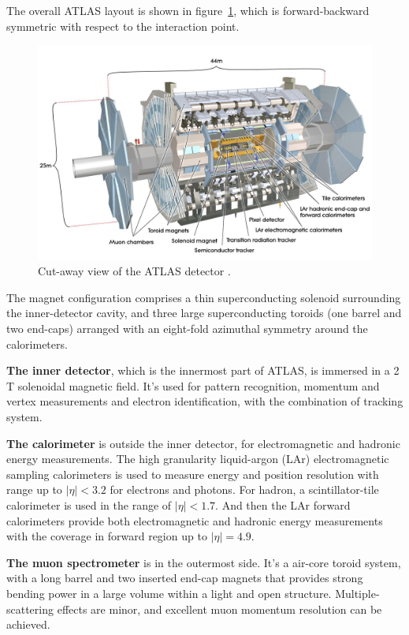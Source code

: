 The overall ATLAS layout is shown in figure~\ref{fig:atlas_layout}, which is forward-backward symmetric with respect to the interaction point.
\begin{figure}[!htb]
  \centering
  \includegraphics[width=1.0\textwidth]{figures/Detector/atlas_layout.jpg}
  \caption{Cut-away view of the ATLAS detector \cite{Pequenao:1095924}.}
  \label{fig:atlas_layout}
\end{figure}
The magnet configuration comprises a thin superconducting solenoid surrounding the inner-detector cavity, 
and three large superconducting toroids (one barrel and two end-caps) arranged with an eight-fold azimuthal symmetry around the calorimeters.

\textbf{The inner detector}, which is the innermost part of ATLAS, is immersed in a 2 T solenoidal magnetic field.
It's used for pattern recognition, momentum and vertex measurements and electron identification, with the combination of tracking system.

\textbf{The calorimeter} is outside the inner detector, for electromagnetic and hadronic energy measurements.
The high granularity liquid-argon (LAr) electromagnetic sampling calorimeters is used to measure energy and position resolution with range up to $|\eta| < 3.2$ for electrons and photons.
For hadron, a scintillator-tile calorimeter is used in the range of $|\eta| < 1.7$.
And then the LAr forward calorimeters provide both electromagnetic and hadronic energy measurements with the coverage in forward region up to $|\eta| = 4.9$.

\textbf{The muon spectrometer} is in the outermost side.
It's a air-core toroid system, with a long barrel and two inserted end-cap magnets that provides strong bending power in a large volume within a light and open structure.
Multiple-scattering effects are minor, and excellent muon momentum resolution can be achieved.
